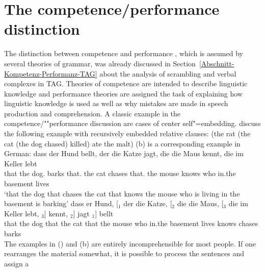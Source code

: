 
\chapter{The competence/performance distinction}
\label{Abschnitt-Diskussion-Performanz}\label{chap-competence-performance}

The distinction\nocite{VL2006a} between competence and performance
\citep[Chapter~I.1]{Chomsky65a}, which is assumed by several theories of grammar, was already
discussed in Section~\ref{Abschnitt-Kompetenz-Performanz-TAG} about the analysis of scrambling and
verbal complexes in TAG. Theories of competence are
intended to describe linguistic knowledge and performance theories are assigned the task of
explaining how linguistic knowledge is used as well as why mistakes are made in speech production
and comprehension. A classic example in the competence/""performance discussion are cases of
center self"=embedding. \citet[]{CM63a} discuss the following example with
recursively embedded relative clauses: 
\ea
(the rat (the cat (the dog chased) killed) ate the malt)
\z
(b) is a corresponding example in German:
\eal
\ex 
\gll dass der Hund bellt, der die Katze jagt, die die Maus kennt, die im Keller lebt\\
     that the dog.\mas{} barks that.\mas{} the cat chases that.\fem{} the mouse knows who in.the basement lives\\
\glt `that the dog that chases the cat that knows the mouse who is living in the basement is barking'
\ex\label{Bsp-Selbsteinbettung} 
\gll dass er Hund, [$_1$ der die Katze, [$_2$ die die Maus, [$_3$ die im Keller lebt,  $_3$] kennt, $_2$] jagt $_1$] bellt\\
     that the dog {} that the cat {} that the mouse      {}    who in.the basement lives {} knows {} chases {} barks\\
\zl
%
The examples in () and (b) are entirely incomprehensible for most people.
If one rearranges the material somewhat, it is possible to process the sentences and assign a
